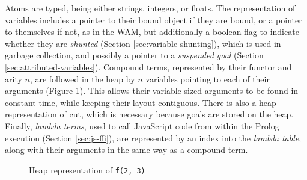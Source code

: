 Atoms are typed, being either strings, integers, or floats. The representation of variables includes a pointer to their bound object if they are bound, or a pointer to themselves if not, as in the WAM, but additionally a boolean flag to indicate whether they are \emph{shunted} (Section \ref{sec:variable-shunting}), which is used in garbage collection, and possibly a pointer to a \emph{suspended goal} (Section \ref{sec:attributed-variables}). Compound terms, represented by their functor and arity $n$, are followed in the heap by $n$ variables pointing to each of their arguments (Figure \ref{fig:compound}). This allows their variable-sized arguments to be found in constant time, while keeping their layout contiguous. There is also a heap representation of cut, which is necessary because goals are stored on the heap. Finally, \emph{lambda terms}, used to call JavaScript code from within the Prolog execution (Section \ref{sec:js-ffi}), are represented by an index into the \emph{lambda table}, along with their arguments in the same way as a compound term.

\begin{figure}[H]
\centering
{}
\caption{Heap representation of \texttt{f(2, 3)}}
\label{fig:compound}
\end{figure}

